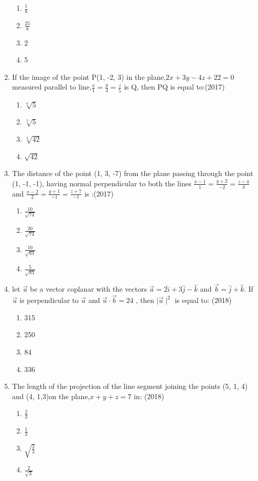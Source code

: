 \documentclass[12pt]{article}
\begin{document}
\begin{enumerate}
\begin{enumerate}
\item $\frac{1}{8}$
\item $\frac{25}{8}$
\item 2
\item 5
\end{enumerate}
\item  If the image of the point P(1, -2, 3) in the plane,$2x+3y-4z+22=0$  measured parallel to line,$\frac{x}{1}=\frac{y}{4}=\frac{z}{5}$ is Q, then PQ is equal to:(2017)
\begin{enumerate}
\item  $\sqrt[6]{5}$
\item  $\sqrt[3]{5}$
\item  $\sqrt[2]{42}$
\item  $\sqrt{42}$
\end{enumerate}
\item The distance of the point (1, 3, -7) from the plane passing through the point (1, -1, -1), having normal perpendicular to both the lines $\frac{x-1}{1}=\frac{y+2}{-2}=\frac{z-4}{3}$ and $\frac{x-2}{2}=\frac{y+1}{-1}=\frac{z+7}{-1}$ is :(2017)
\begin{enumerate}
\item $\frac{10}{\sqrt{74}}$
\item $\frac{20}{\sqrt{74}}$
\item $\frac{10}{\sqrt{83}}$
\item $\frac{5}{\sqrt{83}}$
\end{enumerate}
\item let $\vec{u}$ be a vector coplanar with the vectors $\vec{a}=2\hat{i}+3\hat{j}-\hat{k}$ and $\vec{b}=\hat{j}+\hat{k}$. If $\vec{u}$ is perpendicular to $\vec{a}$ and $\vec{u}\cdot\vec{b}=24$ , then $\mid \vec{u}\mid^2$ is equal to: (2018)
\begin{enumerate}
\item 315
\item 250
\item 84
\item 336
\end{enumerate}
\item The length of the projection  of the line segment joining the points (5, 1, 4) and (4, 1,3)on the plane,$x+y+z=7$ in: (2018)
\begin{enumerate}
\item $\frac{2}{3}$
\item $\frac{1}{3}$
\item $\sqrt{\frac{2}{3}}$
\item $\frac{2}{\sqrt{3}}$

\end{enumerate}
\end{enumerate}
\end{document}
